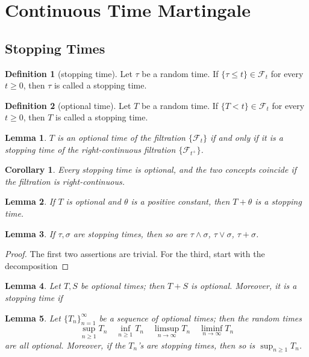 \documentclass{article}
\newtheorem{Cor}{Corollary}[Thm]
\newtheorem{Lem}{Lemma}[section]
\theoremstyle{definition}
\newtheorem{Def}{Definition}[section]
\begin{document}
\section{Continuous Time Martingale}
\subsection{Stopping Times}
\begin{Def}[stopping time]
    Let $\tau$ be a random time. If $\{\tau\le t\}\in\mathcal{F}_t$ for every $t\ge 0$,
    then $\tau$ is called a stopping time.
\end{Def}
\begin{Def}[optional time]
    Let $T$ be a random time. If $\{T<t\}\in\mathcal{F}_t$ for every $t\ge 0$,
    then $T$ is called a stopping time.
\end{Def}
\begin{Lem}
    $T$ is an optional time of the filtration $\{\mathcal{F}_t\}$ if and only if it is a stopping time of the right-continuous
    filtration $\{\mathcal{F}_{t^+}\}$.
\end{Lem}
\begin{Cor}
    Every stopping time is optional, and the two concepts coincide if the filtration is right-continuous.
\end{Cor}
\begin{Lem}
    If $T$ is optional and $\theta$ is a positive constant, then $T+\theta$ is a stopping time.
\end{Lem}
\begin{Lem}
    If $\tau,\sigma$ are stopping times, then so are $\tau\wedge \sigma$, $\tau\vee \sigma$, $\tau+\sigma$.
\end{Lem}
\begin{proof}
    The first two assertions are trivial. \newline 
    For the third, start with the decomposition
\end{proof}
\begin{Lem}
    Let $T,S$ be optional times; then $T+S$ is optional. \newline
    Moreover, it is a stopping time if
\end{Lem}
\begin{Lem}
    Let $\{T_n\}_{n=1}^\infty$ be a sequence of optional times; then the random times 
    \[\sup_{n\ge 1}T_n\quad \inf_{n\ge 1}T_n\quad \limsup_{n\to\infty}T_n\quad \liminf_{n\to\infty}T_n \] 
    are all optional.\newline 
    Moreover, if the $T_n$'s are stopping times, then so is $\sup_{n\ge 1}T_n$.
\end{Lem}
\end{document}
